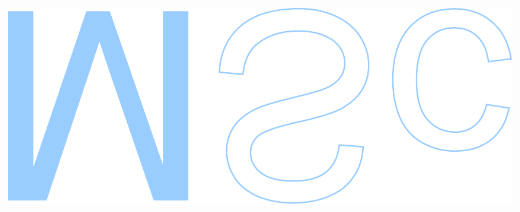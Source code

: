 \documentclass[11pt]{article}
\begin{document}
\begin{flushleft}
	\vspace*{\fill}
	\begin{minipage}[b]{55mm}
		\begin{flushright}
			\includegraphics[angle=-90,scale=0.97]{mscmirror}
		\end{flushright}
	\end{minipage}
	\vspace*{1mm}
\end{flushleft}
\end{document}
